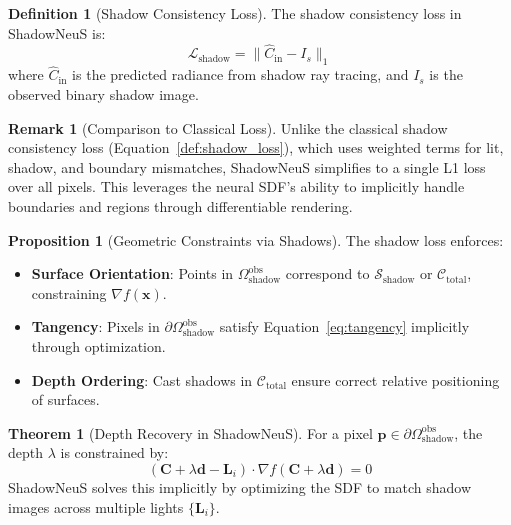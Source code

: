\documentclass[12pt]{article}
\newcommand{\vect}[1]{\bm{#1}}
\theoremstyle{definition}
\newtheorem{definition}{Definition}[subsection]
\newtheorem{theorem}{Theorem}[subsection]
\newtheorem{proposition}{Proposition}[subsection]
\newtheorem{remark}{Remark}[subsection]
\begin{document}
\begin{definition}[Shadow Consistency Loss] \label{def:shadowneus_loss}
The shadow consistency loss in ShadowNeuS is:
\begin{equation}
\boxed{\mathcal{L}_{\text{shadow}} = \|\hat{C}_{\text{in}} - I_s\|_1} \label{eq:shadowneus_loss}
\end{equation}
where \(\hat{C}_{\text{in}}\) is the predicted radiance from shadow ray tracing, and \(I_s\) is the observed binary shadow image.
\end{definition}

\begin{remark}[Comparison to Classical Loss]
Unlike the classical shadow consistency loss (Equation~\ref{def:shadow_loss}), which uses weighted terms for lit, shadow, and boundary mismatches, ShadowNeuS simplifies to a single L1 loss over all pixels. This leverages the neural SDF’s ability to implicitly handle boundaries and regions through differentiable rendering.
\end{remark}

\begin{proposition}[Geometric Constraints via Shadows]
The shadow loss enforces:
\begin{itemize}
    \item \textbf{Surface Orientation}: Points in \(\Omega_{\text{shadow}}^{\text{obs}}\) correspond to \(\mathcal{S}_{\text{shadow}}\) or \(\mathcal{C}_{\text{total}}\), constraining \(\nabla f(\mathbf{x})\).
    \item \textbf{Tangency}: Pixels in \(\partial\Omega_{\text{shadow}}^{\text{obs}}\) satisfy Equation~\eqref{eq:tangency} implicitly through optimization.
    \item \textbf{Depth Ordering}: Cast shadows in \(\mathcal{C}_{\text{total}}\) ensure correct relative positioning of surfaces.
\end{itemize}
\end{proposition}

\begin{theorem}[Depth Recovery in ShadowNeuS]
For a pixel \(\vect{p} \in \partial\Omega_{\text{shadow}}^{\text{obs}}\), the depth \(\lambda\) is constrained by:
\begin{equation}
\boxed{(\mathbf{C} + \lambda \mathbf{d} - \mathbf{L}_i) \cdot \nabla f(\mathbf{C} + \lambda \mathbf{d}) = 0} \label{eq:shadowneus_depth}
\end{equation}
ShadowNeuS solves this implicitly by optimizing the SDF to match shadow images across multiple lights \(\{\mathbf{L}_i\}\).
\end{theorem}
\end{document}
